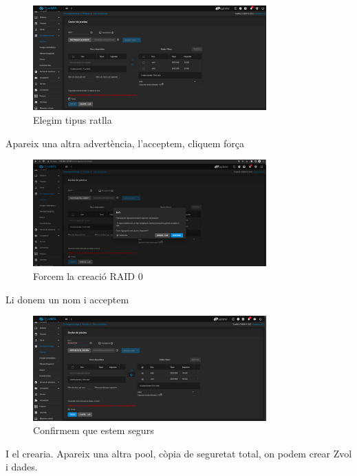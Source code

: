 \documentclass[
  10pt,
]{krantz}
\begin{document}
\begin{figure}
\centering
\includegraphics[width=0.8\textwidth,height=\textheight]{imatges/proxmox/disc_pastrougt4.png}
\caption{Elegim tipus ratlla}
\end{figure}

Apareix una altra advertència, l'acceptem, cliquem força

\begin{figure}
\centering
\includegraphics[width=0.8\textwidth,height=\textheight]{imatges/proxmox/disc_pastrougt5.png}
\caption{Forcem la creació RAID 0}
\end{figure}

Li donem un nom i acceptem

\begin{figure}
\centering
\includegraphics[width=0.8\textwidth,height=\textheight]{imatges/proxmox/disc_pastrougt16.png}
\caption{Confirmem que estem segurs}
\end{figure}

I el crearia. Apareix una altra pool, còpia de seguretat total, on podem crear Zvol i dades.
\end{document}
